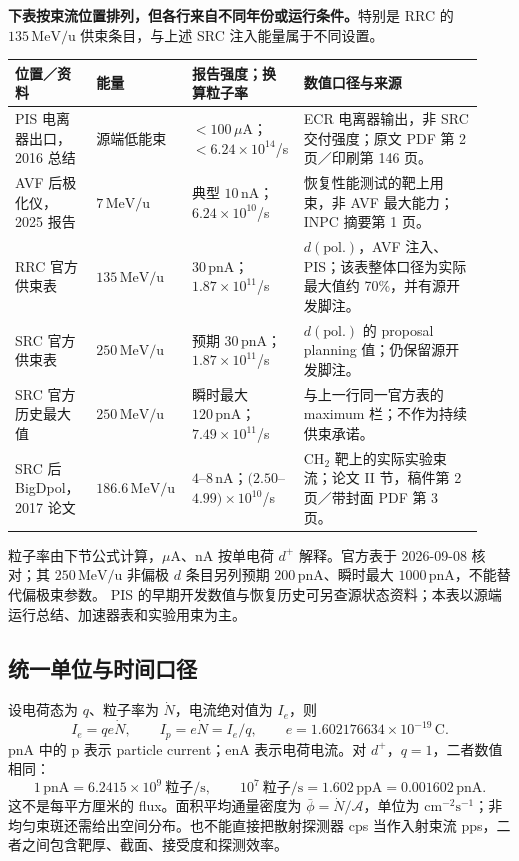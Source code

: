 \documentclass[UTF8,11pt,a4paper]{ctexart}
\begin{document}
\clearpage
\textbf{下表按束流位置排列，但各行来自不同年份或运行条件。}特别是 RRC 的 $135\,\mathrm{MeV/u}$ 供束条目，与上述 SRC 注入能量属于不同设置。
\begingroup
\small
\setlength{\tabcolsep}{4pt}
\begin{longtable}{@{}>{\raggedright\arraybackslash}p{0.16\linewidth}>{\raggedright\arraybackslash}p{0.17\linewidth}>{\raggedright\arraybackslash}p{0.23\linewidth}>{\raggedright\arraybackslash}p{0.37\linewidth}@{}}
\toprule
位置／资料 & 能量 & 报告强度；换算粒子率 & 数值口径与来源 \\
\midrule
\endhead
PIS 电离器出口，2016 总结 & 源端低能束 & $<100\,\mu\mathrm{A}$；$<6.24\times10^{14}$/s & ECR 电离器输出，非 SRC 交付强度；原文 PDF 第 2 页／印刷第 146 页。\cite{sakamoto2016}\\
AVF 后极化仪，2025 报告 & $7\,\mathrm{MeV/u}$ & 典型 $10\,\mathrm{nA}$；$6.24\times10^{10}$/s & 恢复性能测试的靶上用束，非 AVF 最大能力；INPC 摘要第 1 页。\cite{sugahara2025}\\
RRC 官方供束表 & $135\,\mathrm{MeV/u}$ & $30\,\mathrm{pnA}$；$1.87\times10^{11}$/s & $d(\mathrm{pol.})$，AVF 注入、PIS；该表整体口径为实际最大值约 70\%，并有源开发脚注。\cite{accelerator-intensity}\\
SRC 官方供束表 & $250\,\mathrm{MeV/u}$ & 预期 $30\,\mathrm{pnA}$；$1.87\times10^{11}$/s & $d(\mathrm{pol.})$ 的 proposal planning 值；仍保留源开发脚注。\cite{accelerator-intensity}\\
SRC 官方历史最大值 & $250\,\mathrm{MeV/u}$ & 瞬时最大 $120\,\mathrm{pnA}$；$7.49\times10^{11}$/s & 与上一行同一官方表的 maximum 栏；不作为持续供束承诺。\cite{accelerator-intensity}\\
SRC 后 BigDpol，2017 论文 & $186.6\,\mathrm{MeV/u}$ & $4$--$8\,\mathrm{nA}$；$(2.50$--$4.99)\times10^{10}$/s & CH$_2$ 靶上的实际实验束流；论文 II 节，稿件第 2 页／带封面 PDF 第 3 页。\cite{sekiguchi2017}\\
\bottomrule
\end{longtable}
\endgroup

粒子率由下节公式计算，$\mu\mathrm{A}$、$\mathrm{nA}$ 按单电荷 $d^+$ 解释。官方表于 2026-09-08 核对；其 $250\,\mathrm{MeV/u}$ 非偏极 $d$ 条目另列预期 $200\,\mathrm{pnA}$、瞬时最大 $1000\,\mathrm{pnA}$，不能替代偏极束参数。\cite{accelerator-intensity} PIS 的早期开发数值与恢复历史可另查源状态资料；本表以源端运行总结、加速器表和实验用束为主。

\subsection{统一单位与时间口径}
设电荷态为 $q$、粒子率为 $\dot N$，电流绝对值为 $I_e$，则
\[
I_e=q e\dot N,\qquad I_p=e\dot N=I_e/q,
\qquad e=1.602176634\times10^{-19}\,\mathrm C.
\]
$\mathrm{pnA}$ 中的 p 表示 particle current；$\mathrm{enA}$ 表示电荷电流。对 $d^+$，$q=1$，二者数值相同：
\[
1\,\mathrm{pnA}=6.2415\times10^9\ \text{粒子/s},\qquad
10^7\ \text{粒子/s}=1.602\,\mathrm{ppA}=0.001602\,\mathrm{pnA}.
\]
这不是每平方厘米的 flux。面积平均通量密度为 $\bar\phi=\dot N/\mathcal A$，单位为 $\mathrm{cm^{-2}s^{-1}}$；非均匀束斑还需给出空间分布。也不能直接把散射探测器 cps 当作入射束流 pps，二者之间包含靶厚、截面、接受度和探测效率。
\end{document}
